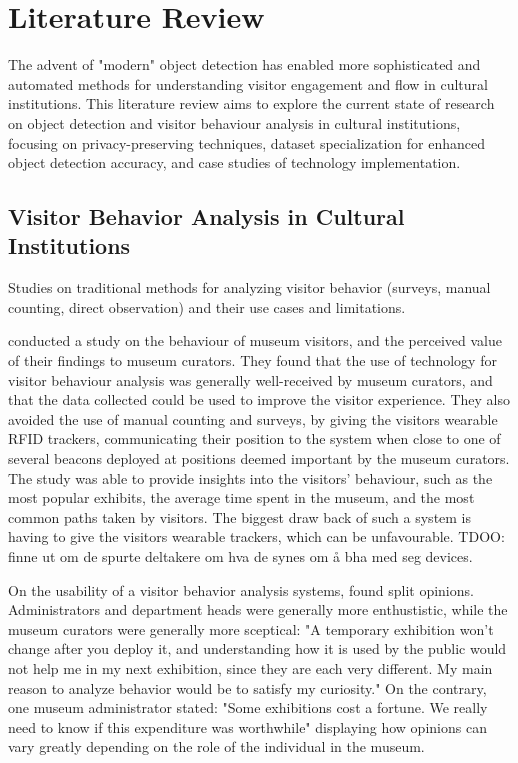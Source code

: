 \section{Literature Review}
The advent of "modern" object detection has enabled more sophisticated and automated methods for understanding visitor engagement and flow in cultural institutions. This literature review aims to explore the current state of research on object detection and visitor behaviour analysis in cultural institutions, focusing on privacy-preserving techniques, dataset specialization for enhanced object detection accuracy, and case studies of technology implementation. 

\subsection{Visitor Behavior Analysis in Cultural Institutions}
Studies on traditional methods for analyzing visitor behavior (surveys, manual counting, direct observation) and their use cases and limitations.



\citeauthor{la2017museumbehaviouranalysis} conducted a study on the behaviour of museum visitors, and the perceived value of their findings to museum curators. They found that the use of technology for visitor behaviour analysis was generally well-received by museum curators, and that the data collected could be used to improve the visitor experience. They also avoided the use of manual counting and surveys, by giving the visitors wearable RFID trackers, communicating their position to the system when close to one of several beacons deployed at positions deemed important by the museum curators. The study was able to provide insights into the visitors' behaviour, such as the most popular exhibits, the average time spent in the museum, and the most common paths taken by visitors. The biggest draw back of such a system is having to give the visitors wearable trackers, which can be unfavourable. TDOO: finne ut om de spurte deltakere om hva de synes om å bha med seg devices.

On the usability of a visitor behavior analysis systems, \cite{la2017museumbehaviouranalysis} found split opinions. Administrators and department heads were generally more enthustistic, while the museum curators were generally more sceptical: "A temporary exhibition won’t
change after you deploy it, and understanding how it is used by the public would not help me in my next exhibition, since they are each very different. My main reason to analyze behavior would be to satisfy my curiosity." On the contrary, one museum administrator stated: "Some exhibitions cost a fortune. We really need to know if this expenditure was worthwhile" displaying how opinions can vary greatly depending on the role of the individual in the museum.



